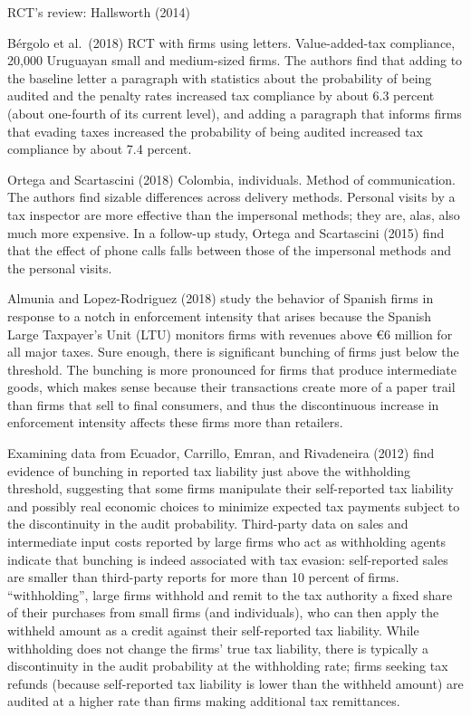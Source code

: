 \documentclass[
  12pt]{article}
\theoremstyle{definition}
\theoremstyle{remark}
\begin{document}
RCT's review: Hallsworth (2014)

Bérgolo et al.~(2018) RCT with firms using letters. Value-added-tax
compliance, 20,000 Uruguayan small and medium-sized firms. The authors
find that adding to the baseline letter a paragraph with statistics
about the probability of being audited and the penalty rates increased
tax compliance by about 6.3 percent (about one-fourth of its current
level), and adding a paragraph that informs firms that evading taxes
increased the probability of being audited increased tax compliance by
about 7.4 percent.

Ortega and Scartascini (2018) Colombia, individuals. Method of
communication. The authors find sizable differences across delivery
methods. Personal visits by a tax inspector are more effective than the
impersonal methods; they are, alas, also much more expensive. In a
follow-up study, Ortega and Scartascini (2015) find that the effect of
phone calls falls between those of the impersonal methods and the
personal visits.

Almunia and Lopez-Rodriguez (2018) study the behavior of Spanish firms
in response to a notch in enforcement intensity that arises because the
Spanish Large Taxpayer's Unit (LTU) monitors firms with revenues above
€6 million for all major taxes. Sure enough, there is significant
bunching of firms just below the threshold. The bunching is more
pronounced for firms that produce intermediate goods, which makes sense
because their transactions create more of a paper trail than firms that
sell to final consumers, and thus the discontinuous increase in
enforcement intensity affects these firms more than retailers.

Examining data from Ecuador, Carrillo, Emran, and Rivadeneira (2012)
find evidence of bunching in reported tax liability just above the
withholding threshold, suggesting that some firms manipulate their
self-reported tax liability and possibly real economic choices to
minimize expected tax payments subject to the discontinuity in the audit
probability. Third-party data on sales and intermediate input costs
reported by large firms who act as withholding agents indicate that
bunching is indeed associated with tax evasion: self-reported sales are
smaller than third-party reports for more than 10 percent of firms.
``withholding'', large firms withhold and remit to the tax authority a
fixed share of their purchases from small firms (and individuals), who
can then apply the withheld amount as a credit against their
self-reported tax liability. While withholding does not change the
firms' true tax liability, there is typically a discontinuity in the
audit probability at the withholding rate; firms seeking tax refunds
(because self-reported tax liability is lower than the withheld amount)
are audited at a higher rate than firms making additional tax
remittances.
\end{document}
